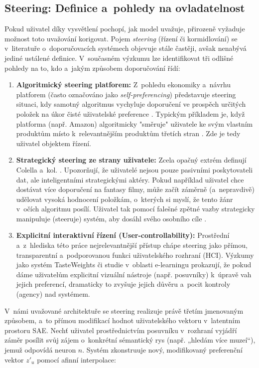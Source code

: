 \subsection{Steering: Definice a~pohledy na ovladatelnost}
\label{subsec:steering}

Pokud uživatel díky vysvětlení pochopí, jak model uvažuje, přirozeně vyžaduje možnost toto uvažování korigovat. Pojem \textit{steering} (řízení či kormidlování) se v~literatuře o~doporučovacích systémech objevuje stále častěji, avšak nenabývá jediné ustálené definice. V~současném výzkumu lze identifikovat tři odlišné pohledy na to, kdo a~jakým způsobem doporučování řídí:

\begin{enumerate}
    \item \textbf{Algoritmický steering platforem:} Z~pohledu ekonomiky a~návrhu platforem (často označováno jako \textit{self-preferencing}) představuje steering situaci, kdy samotný algoritmus vychyluje doporučení ve prospěch určitých položek na úkor čisté uživatelské preference \cite{Chen2024}. Typickým příkladem je, když platforma (např. Amazon) algoritmicky "směruje" uživatele ke svým vlastním produktům místo k~relevantnějším produktům třetích stran \cite{Chen2024}. Zde je tedy uživatel objektem řízení.
    \item \textbf{Strategický steering ze strany uživatele:} Zcela opačný extrém definují Colella a~kol. \cite{Colella2020}. Upozorňují, že uživatelé nejsou pouze pasivními poskytovateli dat, ale inteligentními strategickými aktéry. Pokud například uživatel chce dostávat více doporučení na fantasy filmy, může začít záměrně (a~nepravdivě) udělovat vysoká hodnocení položkám, o~kterých si myslí, že tento žánr v~očích algoritmu posílí. Uživatel tak pomocí falešné zpětné vazby strategicky manipuluje (steeruje) systém, aby dosáhl svého osobního cíle \cite{Colella2020}.
    \item \textbf{Explicitní interaktivní řízení (User-controllability):} Prostřední a~z~hlediska této práce nejrelevantnější přístup chápe steering jako přímou, transparentní a~podporovanou funkci uživatelského rozhraní (HCI). Výzkumy jako systém TasteWeights \cite{Tasteweights2012} či studie v~oblasti e-learningu \cite{Ooge2023} prokazují, že pokud dáme uživatelům explicitní vizuální nástroje (např. posuvníky) k~úpravě vah jejich preferencí, dramaticky to zvyšuje jejich důvěru a~pocit kontroly (agency) nad systémem.
\end{enumerate}

V~námi uvažované architektuře se steering realizuje právě třetím jmenovaným způsobem, a~to přímou modifikací hodnot uživatelského vektoru v~latentním prostoru SAE. Nechť uživatel prostřednictvím posuvníku v~rozhraní vyjádří záměr posílit svůj zájem o~konkrétní sémantický rys (např. „hledám více muzeí“), jemuž odpovídá neuron $n$. Systém zkonstruuje nový, modifikovaný preferenční vektor $z'_u$ pomocí afinní interpolace:

